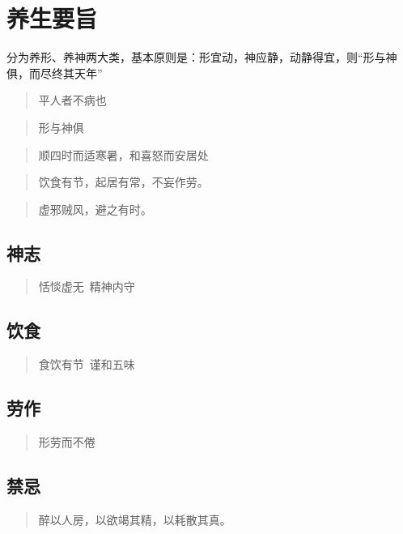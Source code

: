 \chapter{养生要旨}

分为养形、养神两大类，基本原则是：形宜动，神应静，动静得宜，则“形与神俱，而尽终其天年”

\begin{quote}
  平人者不病也
\end{quote}
\begin{quote}
  形与神俱
\end{quote}
\begin{quote}
  顺四时而适寒暑，和喜怒而安居处
\end{quote}
\begin{quote}
  饮食有节，起居有常，不妄作劳。
\end{quote}
\begin{quote}
  虚邪贼风，避之有时。
\end{quote}

\section{神志}
\begin{quote}
  恬惔虚无\ 精神内守
\end{quote}

\section{饮食}
\begin{quote}
  食饮有节\ 谨和五味
\end{quote}

\section{劳作}
\begin{quote}
  形劳而不倦
\end{quote}

\section{禁忌}
\begin{quote}
  醉以人房，以欲竭其精，以耗散其真。
\end{quote}
